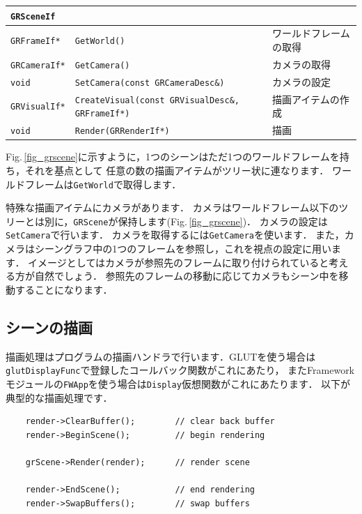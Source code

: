 \begin{center}
\begin{tabular}{p{.15\hsize}p{.45\hsize}p{.3\hsize}}
\texttt{GRSceneIf}	 &															&	\\ \midrule
\texttt{GRFrameIf*}	 & \texttt{GetWorld()}										& \KLUDGE ワールドフレームの取得	\\
\texttt{GRCameraIf*} & \texttt{GetCamera()}										& \KLUDGE カメラの取得	\\
\texttt{void}		 & \texttt{SetCamera(const GRCameraDesc\&)}					& \KLUDGE カメラの設定	\\
\texttt{GRVisualIf*} & \texttt{CreateVisual(const GRVisualDesc\&, GRFrameIf*)}	& \KLUDGE 描画アイテムの作成	\\
\texttt{void}		 & \texttt{Render(GRRenderIf*)}								& \KLUDGE 描画	\\
\end{tabular}
\end{center}


Fig.\,\ref{fig_grscene}\KLUDGE に示すように，1\KLUDGE つのシーンはただ1\KLUDGE つのワールドフレームを持ち，それを基点として
\KLUDGE 任意の数の描画アイテムがツリー状に連なります．
\KLUDGE ワールドフレームは\texttt{GetWorld}\KLUDGE で取得します．

\KLUDGE 特殊な描画アイテムにカメラがあります．
\KLUDGE カメラはワールドフレーム以下のツリーとは別に，\texttt{GRScene}\KLUDGE が保持します(Fig.\,\ref{fig_grscene})\KLUDGE ．
\KLUDGE カメラの設定は\texttt{SetCamera}\KLUDGE で行います．
\KLUDGE カメラを取得するには\texttt{GetCamera}\KLUDGE を使います．
\KLUDGE また，カメラはシーングラフ中の1\KLUDGE つのフレームを参照し，これを視点の設定に用います．
\KLUDGE イメージとしてはカメラが参照先のフレームに取り付けられていると考える方が自然でしょう．
\KLUDGE 参照先のフレームの移動に応じてカメラもシーン中を移動することになります．


\subsection*{\KLUDGE シーンの描画}

\KLUDGE 描画処理はプログラムの描画ハンドラで行います．GLUT\KLUDGE を使う場合は\texttt{glutDisplayFunc}\KLUDGE で登録したコールバック関数がこれにあたり，
\KLUDGE またFramework\KLUDGE モジュールの\texttt{FWApp}\KLUDGE を使う場合は\texttt{Display}\KLUDGE 仮想関数がこれにあたります．
\KLUDGE 以下が典型的な描画処理です．
\begin{verbatim}
    render->ClearBuffer();        // clear back buffer
    render->BeginScene();         // begin rendering

    grScene->Render(render);      // render scene

    render->EndScene();           // end rendering
    render->SwapBuffers();        // swap buffers
\end{verbatim}

